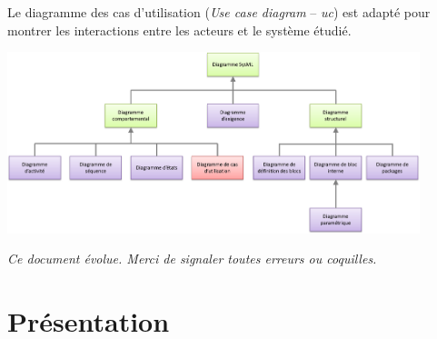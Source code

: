 \documentclass[11pt,oneside]{article}
\begin{document}
Le diagramme des cas d'utilisation (\textit{Use case diagram} -- \textit{uc}) est adapté pour montrer les interactions entre les acteurs et le système étudié.

\begin{center}
\includegraphics[width=0.9\textwidth]{png/diagrammes}
\end{center}


\setlength{\parskip}{0ex plus 0.2ex minus 0ex}
 \renewcommand{\contentsname}{}
 \renewcommand{\baselinestretch}{1}

\tableofcontents

 \renewcommand{\baselinestretch}{1.2}
\setlength{\parskip}{2ex plus 0.5ex minus 0.2ex}

\textit{Ce document évolue. Merci de signaler toutes erreurs ou coquilles.}

\section{Présentation}
\end{document}
